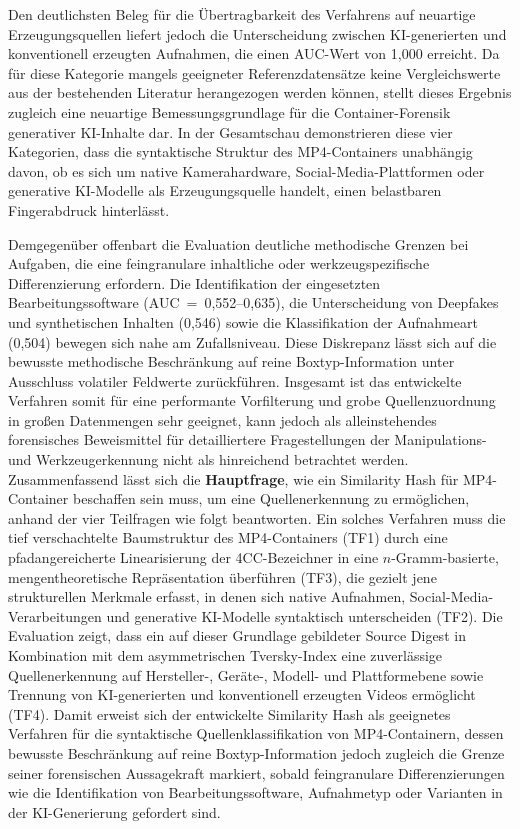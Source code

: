 Den deutlichsten Beleg für die Übertragbarkeit des Verfahrens auf neuartige Erzeugungsquellen liefert jedoch die Unterscheidung zwischen KI-generierten und konventionell erzeugten Aufnahmen, die einen AUC-Wert von 1,000 erreicht. Da für diese Kategorie mangels geeigneter Referenzdatensätze keine Vergleichswerte aus der bestehenden Literatur herangezogen werden können, stellt dieses Ergebnis zugleich eine neuartige Bemessungsgrundlage für die Container-Forensik generativer KI-Inhalte dar. In der Gesamtschau demonstrieren diese vier Kategorien, dass die syntaktische Struktur des MP4-Containers unabhängig davon, ob es sich um native Kamerahardware, Social-Media-Plattformen oder generative KI-Modelle als Erzeugungsquelle handelt, einen belastbaren Fingerabdruck hinterlässt.

Demgegenüber offenbart die Evaluation deutliche methodische Grenzen bei Aufgaben, die eine feingranulare inhaltliche oder werkzeugspezifische Differenzierung erfordern. Die Identifikation der eingesetzten Bearbeitungssoftware (AUC~=~0,552--0,635), die Unterscheidung von Deepfakes und synthetischen Inhalten (0,546) sowie die Klassifikation der Aufnahmeart (0,504) bewegen sich nahe am Zufallsniveau. Diese Diskrepanz lässt sich auf die bewusste methodische Beschränkung auf reine Boxtyp-Information unter Ausschluss volatiler Feldwerte zurückführen. Insgesamt ist das entwickelte Verfahren somit für eine performante Vorfilterung und grobe Quellenzuordnung in großen Datenmengen sehr geeignet, kann jedoch als alleinstehendes forensisches Beweismittel für detailliertere Fragestellungen der Manipulations- und Werkzeugerkennung nicht als hinreichend betrachtet werden.\\


Zusammenfassend lässt sich die \textbf{Hauptfrage}, wie ein Similarity Hash für MP4-Container beschaffen sein muss, um eine Quellenerkennung zu ermöglichen, anhand der vier Teilfragen wie folgt beantworten. Ein solches Verfahren muss die tief verschachtelte Baumstruktur des MP4-Containers (TF1) durch eine pfadangereicherte Linearisierung der 4CC-Bezeichner in eine \(n\)-Gramm-basierte, mengentheoretische Repräsentation überführen (TF3), die gezielt jene strukturellen Merkmale erfasst, in denen sich native Aufnahmen, Social-Media-Verarbeitungen und generative KI-Modelle syntaktisch unterscheiden (TF2). Die Evaluation zeigt, dass ein auf dieser Grundlage gebildeter Source Digest in Kombination mit dem asymmetrischen Tversky-Index eine zuverlässige Quellenerkennung auf Hersteller-, Geräte-, Modell- und Plattformebene sowie Trennung von KI-generierten und konventionell erzeugten Videos ermöglicht (TF4). Damit erweist sich der entwickelte Similarity Hash als geeignetes Verfahren für die syntaktische Quellenklassifikation von MP4-Containern, dessen bewusste Beschränkung auf reine Boxtyp-Information jedoch zugleich die Grenze seiner forensischen Aussagekraft markiert, sobald feingranulare Differenzierungen wie die Identifikation von Bearbeitungssoftware, Aufnahmetyp oder Varianten in der KI-Generierung gefordert sind.\\

